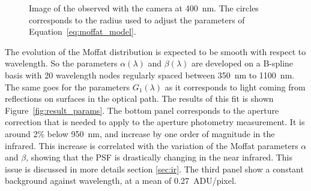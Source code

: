 \begin{figure}[h]
     \centering
     \caption{Image of the \spinhole observed with the \SD camera at \SI{400}{\nano\meter}. The circles corresponds to the radius used to adjust the parameters of Equation~\ref{eq:moffat_model}.}
     \label{fig:apertures_fit}
\end{figure}

The evolution of the Moffat distribution is expected to be smooth with respect to wavelength. So the parameters $\alpha(\lambda)$ and $\beta(\lambda)$ are developed on a B-spline basis with 20 wavelength nodes regularly spaced between \SI{350}{\nano\meter} to \SI{1100}{\nano\meter}. The same goes for the parameters $G_1(\lambda)$ as it corresponds to light coming from reflections on surfaces in the optical path. The results of this fit is shown Figure~\ref{fig:result_params}. The bottom panel corresponds to the aperture correction that is needed to apply to the aperture photometry measurement. It is around 2\% below \SI{950}{\nano\meter}, and increase by one order of magnitude in the infrared. This increase is correlated with the variation of the Moffat parameters $\alpha$ and $\beta$, showing that the PSF is drastically changing in the near infrared. This issue is discussed in more details section \ref{sec:ir}. The third panel show a constant background against wavelength, at a mean of \SI{0.27}{ADU/pixel}.

